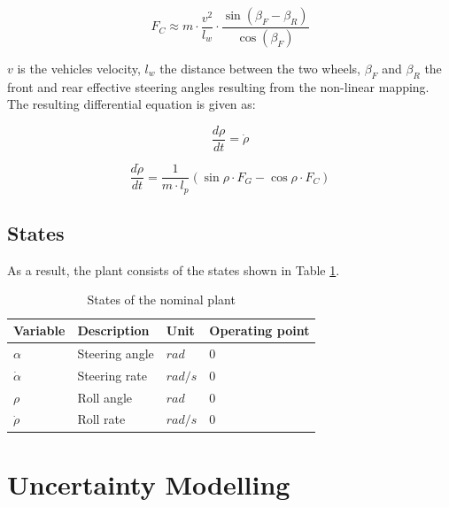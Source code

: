 \documentclass[conference]{IEEEtran}
\begin{document}
\begin{equation}
{F_C} \approx m \cdot \frac{{{v^2}}}{{{l_w}}} \cdot \frac{{\sin \left( {{\beta _F} - {\beta _R}} \right)}}{{\cos \left( {{\beta _F}} \right)}}
\end{equation}

$v$ is the vehicles velocity, $l_w$ the distance between the two wheels, $\beta_F$ and $\beta_R$ the front and rear effective steering angles resulting from the non-linear mapping. The resulting differential equation is given as:


\begin{equation}
\frac{{d\rho }}{{dt}} = \dot \rho
\end{equation}

\begin{equation}
\frac{{d\dot \rho }}{{dt}} = \frac{1}{{m \cdot {l_p}}}\left( {\sin \rho  \cdot {F_G} - \cos \rho  \cdot {F_C}} \right)
\end{equation}


\subsection{States}

As a result, the plant consists of the states shown in Table \ref{figure:states}.

\begin{table}[h]
\begin{center}
\begin{tabular}{|l||l|l|l|}
\hline
Variable 		& Description 		& Unit		& Operating point \\
\hline
$\alpha$ 		& Steering angle 	& $rad$	& 0\\
\hline
$\dot \alpha$	& Steering rate 	& $rad/s$	& 0\\
\hline
$\rho$			& Roll angle 		& $rad$	& 0\\
\hline
$\dot \rho$		& Roll rate 		& $rad/s$	& 0\\
\hline
\end{tabular}
\caption{States of the nominal plant}  
\label{figure:states}
\end{center}
\end{table}


\section{Uncertainty Modelling}


%
\end{document}
